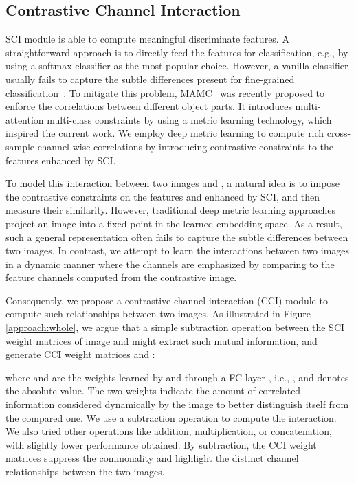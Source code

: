 \documentclass[letterpaper]{article} \usepackage{aaai20}  \usepackage{times}  \usepackage{helvet} \usepackage{courier}  \usepackage[hyphens]{url}  \usepackage{graphicx} \urlstyle{rm} \def\UrlFont{\rm}  \usepackage{graphicx}  \frenchspacing  \setlength{\pdfpagewidth}{8.5in}  \setlength{\pdfpageheight}{11in}  \usepackage{amsmath,amssymb}
\begin{document}
\subsection{Contrastive Channel Interaction}
\label{sec:cca}
SCI module is able to compute meaningful discriminate features. A straightforward approach is to directly feed the features for classification, e.g., by using a softmax classifier as the most popular choice.
However, a vanilla classifier usually fails to capture the subtle differences present for fine-grained classification~\cite{DBLP:conf/cvpr/CuiZLB16}. To mitigate this problem, MAMC~\cite{DBLP:conf/eccv/SunYZD18} was recently proposed to enforce the correlations between different object parts. It introduces multi-attention multi-class constraints by using a metric learning technology, which inspired the current work.
We employ deep metric learning to compute rich cross-sample channel-wise correlations by introducing contrastive constraints to the features enhanced by SCI.


To model this interaction between two images  and , a natural idea is to impose the contrastive constraints on the features   and  enhanced by SCI, and then measure their similarity. However, traditional deep metric learning approaches project an image into a fixed point in the learned embedding space. As a result, such a general representation often fails to capture the subtle differences between two images. In contrast, we attempt to learn the interactions between two images in a dynamic manner where the channels are emphasized by comparing to the feature channels computed from the contrastive image.

Consequently, we propose a contrastive channel interaction (CCI) module to compute such relationships between two images. As illustrated in Figure \ref{approach:whole}, we argue that a simple subtraction operation between the SCI weight matrices of image  and  might extract such mutual information, and generate CCI weight matrices  and :

where  and  are the weights learned by  and  through a FC layer , i.e., , and  denotes the absolute value.
The two weights indicate the amount of correlated information considered dynamically by the image to better distinguish itself from the compared one.
We use a subtraction operation to compute the interaction. We also tried other operations like addition, multiplication, or concatenation, with slightly lower performance obtained. By subtraction,
the CCI weight matrices suppress the commonality and highlight the distinct channel relationships between the two images.
\end{document}
